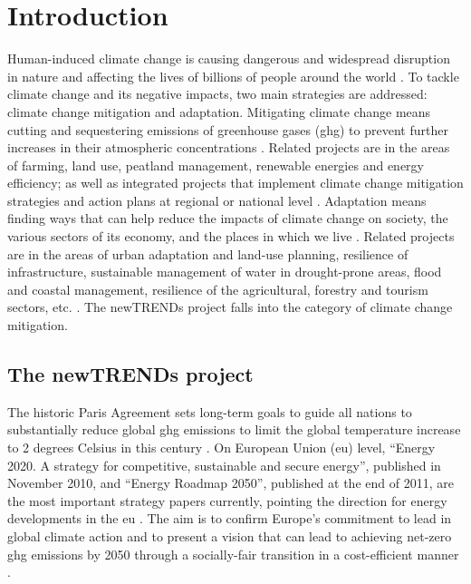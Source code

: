 \chapter{Introduction}


Human-induced climate change is causing dangerous and widespread disruption in nature and affecting the lives of billions of people around the world \cite{ipcc}. 
To tackle climate change and its negative impacts, two main strategies are addressed: climate change mitigation and adaptation. 
Mitigating climate change means cutting and sequestering emissions of greenhouse gases (\gls{ghg}) to prevent further increases in their atmospheric concentrations \cite{handbook}. 
Related projects are in the areas of farming, land use, peatland management, renewable energies and energy efficiency; as well as integrated projects that implement climate change mitigation strategies and action plans at regional or national level \cite{ec}. 
Adaptation means finding ways that can help reduce the impacts of climate change on society, the various sectors of its economy, and the places in which we live \cite{handbook}. 
Related projects are in the areas of urban adaptation and land-use planning, resilience of infrastructure, sustainable management of water in drought-prone areas, flood and coastal management, resilience of the agricultural, forestry and tourism sectors, etc. \cite{ec}.  
The newTRENDs project falls into the category of climate change mitigation. 





\section{The newTRENDs project}




The historic Paris Agreement sets long-term goals to guide all nations to substantially reduce global \gls{ghg} emissions to limit the global temperature increase to 2 degrees Celsius in this century \cite{paris}. 
On European Union (\gls{eu}) level, “Energy 2020. A strategy for competitive, sustainable and secure energy”, published in November 2010, and “Energy Roadmap 2050”, published at the end of 2011, are the most important strategy papers currently, pointing the direction for energy developments in the \gls{eu} \cite{roadmap}. 
The aim is to confirm Europe's commitment to lead in global climate action and to present a vision that can lead to achieving net-zero \gls{ghg} emissions by 2050 through a socially-fair transition in a cost-efficient manner \cite{clean}. 

